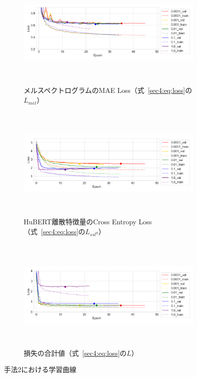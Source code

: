 \documentclass[12pt]{jarticle}
\numberwithin{equation}{section}    %
\numberwithin{figure}{section}      %
\numberwithin{table}{section}      %
\begin{document}
\begin{figure}[bt]
    \centering
    \begin{subfigure}{\linewidth}
        \centering
        \includegraphics[height=55mm]{./figure/sec4/learning_curves/2/mel_loss.png}
        \caption{メルスペクトログラムのMAE Loss（式~\eqref{sec4:eq:loss}の$L_{mel}$）}
        \label{sec4:fig:learning_curve_method_2_val_mel_loss}
    \end{subfigure}
    \begin{subfigure}{\linewidth}
        \centering
        \includegraphics[height=55mm]{./figure/sec4/learning_curves/2/ssl_feature_cluster_loss.png}
        \caption{HuBERT離散特徴量のCross Entropy Loss（式~\eqref{sec4:eq:loss}の$L_{ssl^{d}}$）}
        \label{sec4:fig:learning_curve_method_2_val_ssl_feature_cluster_loss}
    \end{subfigure}
    \begin{subfigure}{\linewidth}
        \centering
        \includegraphics[height=55mm]{./figure/sec4/learning_curves/2/total_loss.png}
        \caption{損失の合計値（式~\eqref{sec4:eq:loss}の$L$）}
        \label{sec4:fig:learning_curve_method_2_val_total_loss}
    \end{subfigure}
    \caption{手法2における学習曲線}
    \label{sec4:fig:learning_curve_method_2_val_losses}
\end{figure}
\end{document}
